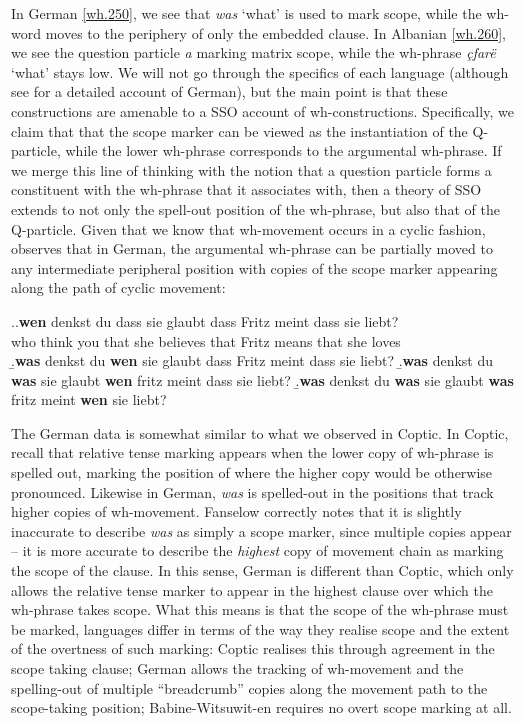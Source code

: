 \documentclass{glossa}
\begin{document}
In German \ref{wh.250}, we see that \textit{was} `what' is used to mark scope, while the wh-word moves to the periphery of only the embedded clause. In Albanian \ref{wh.260}, we see the question particle \textit{a} marking matrix scope, while the wh-phrase \textit{\c{c}far\"e} `what' stays low. We will not go through the specifics of each language (although see \citealp{fanselow-cavar:2000} for a detailed account of German), but the main point is that these constructions are amenable to a SSO account of wh-constructions. Specifically, we claim that that the scope marker can be viewed as the instantiation of the Q-particle, while the lower wh-phrase corresponds to the argumental wh-phrase. If we merge this line of thinking with the notion that a question particle forms a constituent with the wh-phrase that it associates with, then a theory of SSO extends to not only the spell-out position of the wh-phrase, but also that of the Q-particle. Given that we know that wh-movement occurs in a cyclic fashion, \cite{fanselow:2006} observes that in German, the argumental wh-phrase can be partially moved to any intermediate peripheral position with copies of the scope marker appearing along the path of cyclic movement:

\ex.\label{wh.270}\ag.\label{wh.270a}\textbf{wen} denkst du dass sie glaubt dass Fritz meint dass sie liebt?\\
   who think you that she believes that Fritz means that she loves\\
   \b.\textbf{was} denkst du \textbf{wen} sie glaubt dass Fritz meint dass sie liebt?
   \b.\textbf{was} denkst du \textbf{was} sie glaubt \textbf{wen} fritz meint dass sie liebt?
   \b.\textbf{was} denkst du \textbf{was} sie glaubt \textbf{was} fritz meint \textbf{wen} sie liebt?

The German data is somewhat similar to what we observed in Coptic. In Coptic, recall that relative tense marking appears when the lower copy of wh-phrase is spelled out, marking the position of where the higher copy would be otherwise pronounced. Likewise in German, \textit{was} is spelled-out in the positions that track higher copies of wh-movement. Fanselow correctly notes that it is slightly inaccurate to describe \textit{was} as simply a scope marker, since multiple copies appear -- it is more accurate to describe the \textit{highest} copy of movement chain as marking the scope of the clause. In this sense, German is different than Coptic, which only allows the relative tense marker to appear in the highest clause over which the wh-phrase takes scope. What this means is that the scope of the wh-phrase must be marked, languages differ in terms of the way they realise scope and the extent of the overtness of such marking: Coptic realises this through agreement in the scope taking clause; German allows the tracking of wh-movement and the spelling-out of multiple ``breadcrumb'' copies along the movement path to the scope-taking position; Babine-Witsuwit-en requires no overt scope marking at all.
\end{document}
